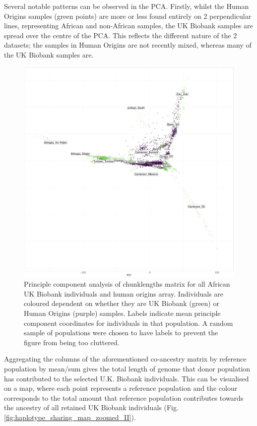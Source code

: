 Several notable patterns can be observed in the PCA. Firstly, whilst the Human Origins samples (green points) are more or less found entirely on 2 perpendicular lines, representing African and non-African samples, the UK Biobank samples are spread over the centre of the PCA. This reflects the different nature of the 2 datasets; the samples in Human Origins are not recently mixed, whereas many of the UK Biobank samples are.

\begin{figure}[htp]
    \centering
    \includegraphics[width=1.0\textwidth]{../images/chapter3/ChromoPainter_PCA_UKB_HO.pdf}
    \caption{Principle component analysis of chunklengths matrix for all African UK Biobank individuals and human origins array. Individuals are coloured dependent on whether they are UK Biobank (green) or Human Origins (purple) samples. Labels indicate mean principle component coordinates for individuals in that population. A random sample of populations were chosen to have labels to prevent the figure from being too cluttered.}
    \label{fig:PCA_chunklengths_HumanOrigins_UKBiobank}
\end{figure}

Aggregating the columns of the aforementioned co-ancestry matrix by reference population by mean/sum gives the total length of genome that donor population has contributed to the selected U.K. Biobank individuals. This can be visualised on a map, where each point represents a reference population and the colour corresponds to the total amount that reference population contributes towards the ancestry of all retained UK Biobank individuals (Fig. \ref{fig:haplotype_sharing_map_zoomed_II}).

